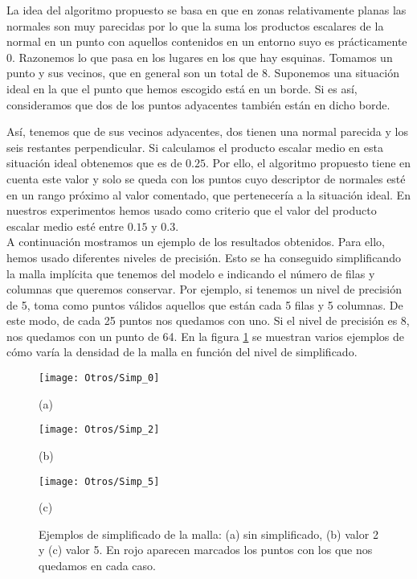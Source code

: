 La idea del algoritmo propuesto se basa en que en zonas relativamente planas las normales son muy parecidas por lo que la suma los productos escalares de la normal en un punto con aquellos contenidos en un entorno suyo es prácticamente 0. Razonemos lo que pasa en los lugares en los que hay esquinas. Tomamos un punto y sus vecinos, que en general son un total de 8. Suponemos una situación ideal en la que el punto que hemos escogido está en un borde. Si es así, consideramos que dos de los puntos adyacentes también están en dicho borde. \begin{comment}
INCLUIR DIBUJO !!!!!!!!!!!!!!!11
\end{comment} 
Así, tenemos que de sus vecinos adyacentes, dos tienen una normal parecida y los seis restantes perpendicular. Si calculamos el producto escalar medio en esta situación ideal obtenemos que es de $ 0.25 $. Por ello, el algoritmo propuesto tiene en cuenta este valor y solo se queda con los puntos cuyo descriptor de normales esté en un rango próximo al valor comentado, que pertenecería a la situación ideal. En nuestros experimentos hemos usado como criterio que el valor del producto escalar medio esté entre $ 0.15 $ y $ 0.3 $. \\

A continuación mostramos un ejemplo de los resultados obtenidos. Para ello, hemos usado diferentes niveles de precisión. Esto se ha conseguido simplificando la malla implícita que tenemos del modelo e indicando el número de filas y columnas que queremos conservar. Por ejemplo, si tenemos un nivel de precisión de 5, toma como puntos válidos aquellos que están cada 5 filas y 5 columnas. De este modo, de cada 25 puntos nos quedamos con uno. Si el nivel de precisión es 8, nos quedamos con un punto de 64. En la figura \ref{Ej_simpli} se muestran varios ejemplos de cómo varía la densidad de la malla en función del nivel de simplificado.
\begin{figure}[h!]
	\centering
	\begin{minipage}[b]{0.45\textwidth}
		\centering
		\texttt{[image: Otros/Simp\_0]}
		\caption*{(a)}
	\end{minipage}
	\begin{minipage}[b]{0.45\textwidth}
		\centering
		\texttt{[image: Otros/Simp\_2]}
		\caption*{(b)}
	\end{minipage}
	\begin{minipage}[b]{0.45\textwidth}
		\centering
		\texttt{[image: Otros/Simp\_5]}
		\caption*{(c)}
	\end{minipage}
	\caption{Ejemplos de simplificado de la malla: (a) sin simplificado, (b) valor 2 y (c) valor 5. En rojo aparecen marcados los puntos con los que nos quedamos en cada caso.}
	\label{Ej_simpli}
\end{figure}

